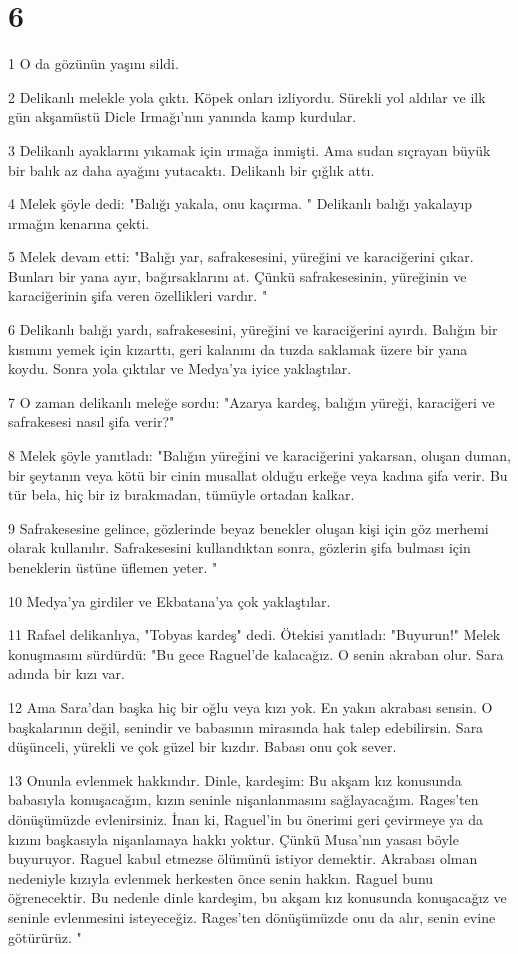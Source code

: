 \chapter{6}

\par 1 O da gözünün yaşını sildi.
\par 2 Delikanlı melekle yola çıktı. Köpek onları izliyordu. Sürekli yol aldılar ve ilk gün akşamüstü Dicle Irmağı'nın yanında kamp kurdular.
\par 3 Delikanlı ayaklarını yıkamak için ırmağa inmişti. Ama sudan sıçrayan büyük bir balık az daha ayağını yutacaktı. Delikanlı bir çığlık attı.
\par 4 Melek şöyle dedi: "Balığı yakala, onu kaçırma. " Delikanlı balığı yakalayıp ırmağın kenarına çekti.
\par 5 Melek devam etti: "Balığı yar, safrakesesini, yüreğini ve karaciğerini çıkar. Bunları bir yana ayır, bağırsaklarını at. Çünkü safrakesesinin, yüreğinin ve karaciğerinin şifa veren özellikleri vardır. "
\par 6 Delikanlı balığı yardı, safrakesesini, yüreğini ve karaciğerini ayırdı. Balığın bir kısmını yemek için kızarttı, geri kalanını da tuzda saklamak üzere bir yana koydu. Sonra yola çıktılar ve Medya'ya iyice yaklaştılar.
\par 7 O zaman delikanlı meleğe sordu: "Azarya kardeş, balığın yüreği, karaciğeri ve safrakesesi nasıl şifa verir?"
\par 8 Melek şöyle yanıtladı: "Balığın yüreğini ve karaciğerini yakarsan, oluşan duman, bir şeytanın veya kötü bir cinin musallat olduğu erkeğe veya kadına şifa verir. Bu tür bela, hiç bir iz bırakmadan, tümüyle ortadan kalkar.
\par 9 Safrakesesine gelince, gözlerinde beyaz benekler oluşan kişi için göz merhemi olarak kullanılır. Safrakesesini kullandıktan sonra, gözlerin şifa bulması için beneklerin üstüne üflemen yeter. "
\par 10 Medya'ya girdiler ve Ekbatana'ya çok yaklaştılar.
\par 11 Rafael delikanlıya, "Tobyas kardeş" dedi. Ötekisi yanıtladı: "Buyurun!" Melek konuşmasını sürdürdü: "Bu gece Raguel'de kalacağız. O senin akraban olur. Sara adında bir kızı var.
\par 12 Ama Sara'dan başka hiç bir oğlu veya kızı yok. En yakın akrabası sensin. O başkalarının değil, senindir ve babasının mirasında hak talep edebilirsin. Sara düşünceli, yürekli ve çok güzel bir kızdır. Babası onu çok sever.
\par 13 Onunla evlenmek hakkındır. Dinle, kardeşim: Bu akşam kız konusunda babasıyla konuşacağım, kızın seninle nişanlanmasını sağlayacağım. Rages'ten dönüşümüzde evlenirsiniz. İnan ki, Raguel'in bu önerimi geri çevirmeye ya da kızını başkasıyla nişanlamaya hakkı yoktur. Çünkü Musa'nın yasası böyle buyuruyor. Raguel kabul etmezse ölümünü istiyor demektir. Akrabası olman nedeniyle kızıyla evlenmek herkesten önce senin hakkın. Raguel bunu öğrenecektir. Bu nedenle dinle kardeşim, bu akşam kız konusunda konuşacağız ve seninle evlenmesini isteyeceğiz. Rages'ten dönüşümüzde onu da alır, senin evine götürürüz. "
